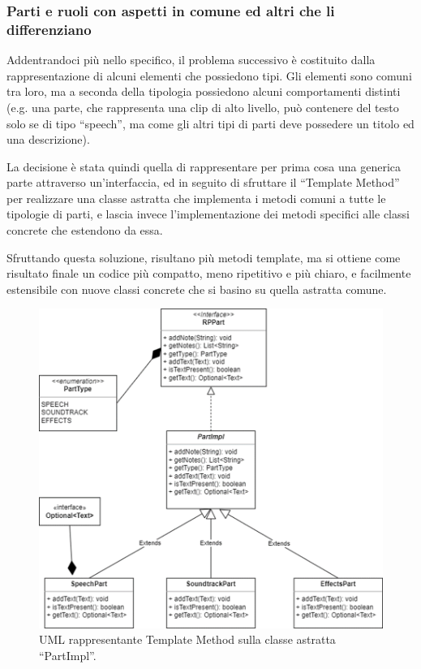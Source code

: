 \documentclass[a4paper,12pt]{report}
\begin{document}
\subsubsection{Parti e ruoli con aspetti in comune ed altri che li differenziano}
Addentrandoci più nello specifico, il problema successivo è costituito dalla rappresentazione di alcuni elementi che possiedono tipi. Gli elementi sono comuni tra loro, ma a seconda della tipologia possiedono alcuni comportamenti distinti (e.g. una parte, che rappresenta una clip di alto livello, può contenere del testo solo se di tipo “speech”, ma come gli altri tipi di parti deve possedere un titolo ed una descrizione).

La decisione è stata quindi quella di rappresentare per prima cosa una generica parte attraverso un’interfaccia, ed in seguito di sfruttare il “Template Method” per realizzare una classe astratta che implementa i metodi comuni a tutte le tipologie di parti, e lascia invece l’implementazione dei metodi specifici alle classi concrete che estendono da essa.

Sfruttando questa soluzione, risultano più metodi template, ma si ottiene come risultato finale un codice più compatto, meno ripetitivo e più chiaro, e facilmente estensibile con nuove classi concrete che si basino su quella astratta comune.

\begin{figure}[H]
\centering{}
\includegraphics[scale=0.85]{img/part.png}
\caption{UML rappresentante Template Method sulla classe astratta “PartImpl”.}
\end{figure}
\end{document}
